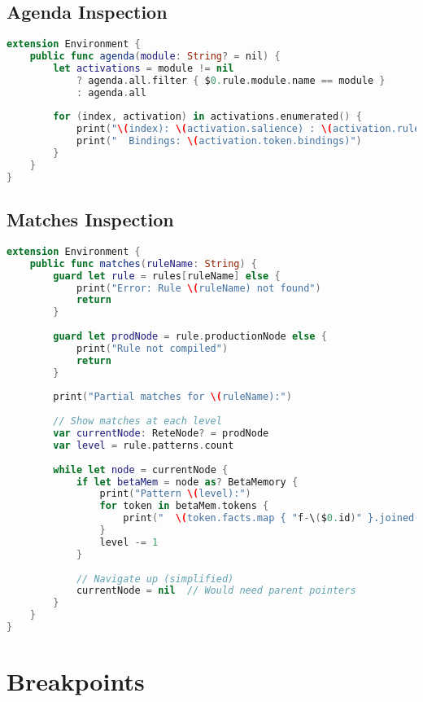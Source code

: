 \subsection{Agenda Inspection}

\begin{lstlisting}[language=Swift]
extension Environment {
    public func agenda(module: String? = nil) {
        let activations = module != nil
            ? agenda.all.filter { $0.rule.module.name == module }
            : agenda.all
        
        for (index, activation) in activations.enumerated() {
            print("\(index): \(activation.salience) : \(activation.rule.name)")
            print("  Bindings: \(activation.token.bindings)")
        }
    }
}
\end{lstlisting}

\subsection{Matches Inspection}

\begin{lstlisting}[language=Swift]
extension Environment {
    public func matches(ruleName: String) {
        guard let rule = rules[ruleName] else {
            print("Error: Rule \(ruleName) not found")
            return
        }
        
        guard let prodNode = rule.productionNode else {
            print("Rule not compiled")
            return
        }
        
        print("Partial matches for \(ruleName):")
        
        // Show matches at each level
        var currentNode: ReteNode? = prodNode
        var level = rule.patterns.count
        
        while let node = currentNode {
            if let betaMem = node as? BetaMemory {
                print("Pattern \(level):")
                for token in betaMem.tokens {
                    print("  \(token.facts.map { "f-\($0.id)" }.joined(separator: ", "))")
                }
                level -= 1
            }
            
            // Navigate up (simplified)
            currentNode = nil  // Would need parent pointers
        }
    }
}
\end{lstlisting}

\section{Breakpoints}

